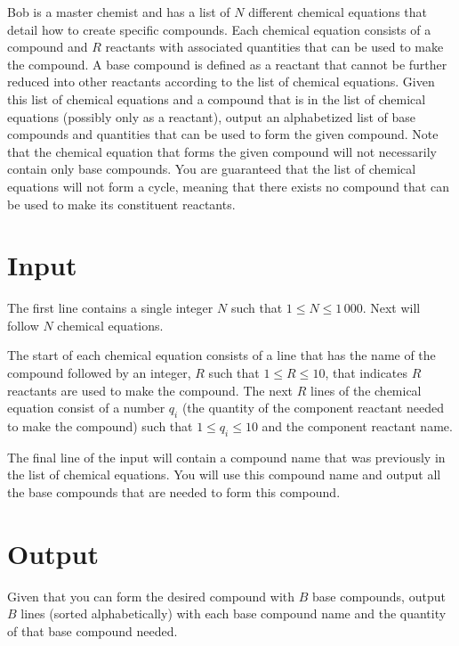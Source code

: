
Bob is a master chemist and has a list of $N$ different chemical equations that detail how to create specific
compounds. Each chemical equation consists of a compound and $R$ reactants with associated quantities that can 
be used to make the compound. A base compound is defined as a reactant that cannot be further reduced into other 
reactants according to the list of chemical equations. Given this list of chemical equations and a compound that
is in the list of chemical equations (possibly only as a reactant), output an alphabetized list of base compounds 
and quantities that can be used to form the given compound. Note that the chemical equation that forms the given 
compound will not necessarily contain only base compounds. You are guaranteed that the list of chemical equations
will not form a cycle, meaning  that there exists no compound that can be used to make its constituent reactants.

\section*{Input}
The first line contains a single integer $N$ such that $1 \leq N \leq 1\,000$.
Next will follow $N$ chemical equations. 

The start of each chemical equation consists of a line that has the name of the compound followed by an integer,
$R$ such that $1 \leq R \leq 10$, that indicates $R$ reactants are used to make the compound. The next $R$ 
lines of the chemical equation consist of a number $q_i$ (the quantity of the component reactant needed to make
the compound) such that $1 \leq q_i \leq 10$ and the component reactant name.

The final line of the input will contain a compound name that was previously in the list of chemical
equations. You will use this compound name and output all the base compounds that are needed to form 
this compound.

\section*{Output}
Given that you can form the desired compound with $B$ base compounds, output $B$ lines (sorted alphabetically)
with each base compound name and the quantity of that base compound needed.
